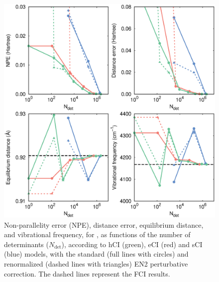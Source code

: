 \documentclass[aip,jcp,preprint,noshowkeys,superscriptaddress]{revtex4-1}
\newcommand{\Ndet}{N_\text{det}}
\begin{document}
\begin{figure}%
\includegraphics[width=1.0\linewidth]{plot_pt2_rpt2_HF}
\caption{
Non-parallelity error (NPE), distance error, equilibrium distance, and vibrational frequency, for ,
as functions of the number of determinants ($\Ndet$), according to hCI (green), eCI (red) and sCI (blue) models,
with the standard (full lines with circles) and renormalized (dashed lines with triangles) EN2 perturbative correction.
The dashed lines represent the FCI results.}
\label{fig:plot_pt2_rpt2_hf}
\end{figure}
\end{document}

